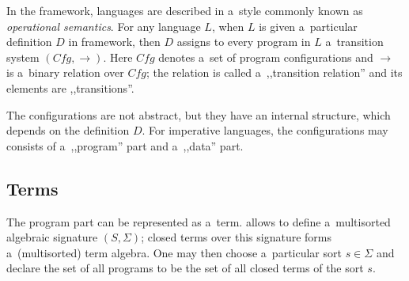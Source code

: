 \documentclass{fithesis3}
\newcommand{\var}[1]{\mathit{#1}\xspace}
\begin{document}
In the \K framework, languages are described in a~style commonly known as \textit{operational semantics}. For any language $\var{L}$, when $\var{L}$ is given a~particular definition $\var{D}$ in \K framework, then $\var{D}$ assigns to every program in $\var{L}$ a~transition system $( \var{Cfg}, \rightarrow )$. Here $\var{Cfg}$ denotes a~set of program configurations and $\rightarrow$ is a~binary relation over $\var{Cfg}$; the relation is called a~,,transition relation'' and its elements are ,,transitions''. %


The configurations are not abstract, but they have an internal structure, which depends on the definition $\var{D}$. 
For imperative languages, the configurations may consists of a~,,program'' part and a~,,data'' part.

\subsection{Terms}

The program part can be represented as a~term. \K allows to define a~multisorted algebraic signature $(S, \Sigma)$; closed terms over this signature forms a~(multisorted) term algebra. One may then choose a~particular sort $s \in \Sigma$ and declare the set of all programs to be the set of all closed terms of the sort $s$.
\end{document}
